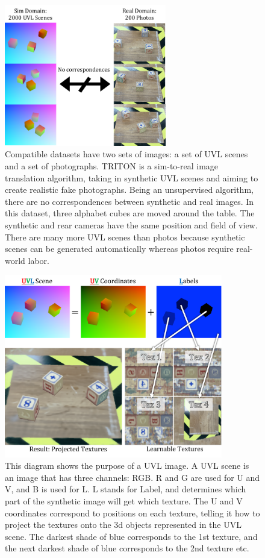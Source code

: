 \documentclass{article}
\begin{document}
\begin{figure}[H]
	\begin{center}
		\includegraphics[width=200pt]{../images/dataset_explanation.pdf}
	\end{center}
	\caption{
		Compatible datasets have two sets of images: a set of UVL scenes and a set of photographs.
		TRITON is a sim-to-real image translation algorithm, taking in synthetic UVL scenes and aiming to create realistic fake photographs. 
		Being an unsupervised algorithm, there are no correspondences between synthetic and real images.
		In this dataset, three alphabet cubes are moved around the table. 
		The synthetic and rear cameras have the same position and field of view.
		There are many more UVL scenes than photos because synthetic scenes can be generated automatically whereas photos require real-world labor.
		}
	\label{fig:dataset_explanation}
\end{figure}


\begin{figure}[H]
	\begin{center}
		\includegraphics[width=270pt]{../images/uvl_explanation.pdf}
	\end{center}
	\caption{
		This diagram shows the purpose of a UVL image.
		 A UVL scene is an image that has three channels: RGB.
		 R and G are used for U and V, and B is used for L.
		 L stands for Label, and determines which part of the synthetic image will get which texture.
		 The U and V coordinates correspond to positions on each texture,
		 	telling it how to project the textures onto the 3d objects represented in the UVL scene.
		The darkest shade of blue corresponds to the 1st texture, and the next darkest shade of blue corresponds to the 2nd texture etc.
		}
	\label{fig:uvl_explanation}
\end{figure}
\end{document}
